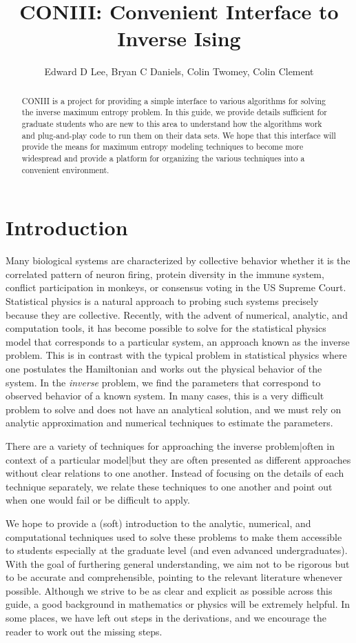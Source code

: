 \documentclass[11pt]{amsart}
\title{CONIII: Convenient Interface to Inverse Ising}
\author{Edward D Lee, Bryan C Daniels, Colin Twomey, Colin Clement}
\begin{document}
\begin{abstract}
CONIII is a project for providing a simple interface to various algorithms for solving the inverse maximum entropy problem. In this guide, we provide details sufficient for graduate students who are new to this area to understand how the algorithms work and plug-and-play code to run them on their data sets. We hope that this interface will provide the means for maximum entropy modeling techniques to become more widespread and provide a platform for organizing the various techniques into a convenient environment.
\end{abstract}

\maketitle

\section{Introduction}
Many biological systems are characterized by collective behavior whether it is the correlated pattern of neuron firing, protein diversity in the immune system, conflict participation in monkeys, or consensus voting in the US Supreme Court. Statistical physics is a natural approach to probing such systems precisely because they are collective.
Recently, with the advent of numerical, analytic, and computation tools, it has become possible to solve for the statistical physics model that corresponds to a particular system, an approach known as the inverse problem.
This is in contrast with the typical problem in statistical physics where one postulates the Hamiltonian and works out the physical behavior of the system. In the \textit{inverse} problem, we  find the parameters that correspond to observed behavior of a known system. In many cases, this is a very difficult problem to solve and does not have an analytical solution, and we must rely on analytic approximation and numerical techniques to estimate the parameters.

There are a variety of techniques for approaching the inverse problem|often in context of a particular model|but they are often presented as different approaches without clear relations to one another. Instead of focusing on the details of each technique separately, we relate these techniques to one another and point out when one would fail or be difficult to apply.

We hope to provide a (soft) introduction to the analytic, numerical, and computational techniques used to solve these problems to make them accessible to students especially at the graduate level (and even advanced undergraduates). With the goal of furthering general understanding, we aim not to be rigorous but to be accurate and comprehensible, pointing to the relevant literature whenever possible. Although we strive to be as clear and explicit as possible across this guide, a good background in mathematics or physics will be extremely helpful. In some places, we have left out steps in the derivations, and we encourage the reader to work out the missing steps.
\end{document}
